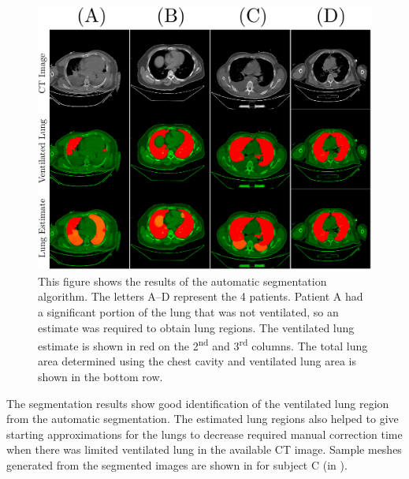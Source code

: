 \begin{figure}
	\centering
	\includegraphics[width=\textwidth]{chapter5-CT_to_mesh/imgs/lung_segmentation_results.pdf}
	\caption[Lung segmentation results]{\label{fig:lung-seg-results}%
	This figure shows the results of the automatic segmentation algorithm. The letters A--D 
	represent the 4 patients. Patient A had a significant portion of the lung that was not
	ventilated, so an estimate was required to obtain lung regions. The ventilated lung estimate
	is shown in red on the 2\textsuperscript{nd} and 3\textsuperscript{rd} columns.
	The total lung area determined using the chest cavity and ventilated lung area is shown in the
	bottom row.}
\end{figure}

The segmentation results show good identification of the
ventilated lung region from the automatic segmentation. The estimated lung regions also helped to 
give starting approximations for the lungs to decrease required manual 
correction time when there was limited ventilated lung in the available CT image.
Sample meshes generated from the segmented images are shown in  
for subject C (in ).

